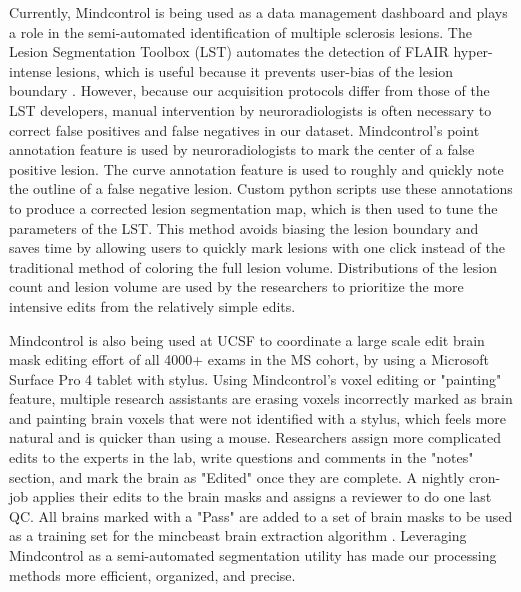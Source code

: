 Currently, Mindcontrol is being used as a data management dashboard and plays a role in the semi-automated identification of multiple sclerosis lesions. The Lesion Segmentation Toolbox (LST) automates the detection of FLAIR hyper-intense lesions, which is useful because it prevents user-bias of the lesion boundary \cite{Schmidt_2012}. However, because our acquisition protocols differ from those of the LST developers, manual intervention by neuroradiologists is often necessary to correct false positives and false negatives in our dataset. Mindcontrol's point annotation feature is used by neuroradiologists to mark the center of a false positive lesion. The curve annotation feature is used to roughly and quickly note the outline of a false negative lesion. Custom python scripts use these annotations to produce a corrected lesion segmentation map, which is then used to tune the parameters of the LST. This method avoids biasing the lesion boundary and saves time by allowing users to quickly mark lesions with one click instead of the traditional method of coloring the full lesion volume. Distributions of the lesion count and lesion volume are used by the researchers to prioritize the more intensive edits from the relatively simple edits.

Mindcontrol is also being used at UCSF to coordinate a large scale edit brain mask editing effort of all 4000+ exams in the MS cohort, by using a Microsoft Surface Pro 4 tablet with stylus. Using Mindcontrol's voxel editing or "painting" feature, multiple research assistants are erasing voxels incorrectly marked as brain and painting brain voxels that were not identified with a stylus, which feels more natural and is quicker than using a mouse. Researchers assign more complicated edits to the experts in the lab, write questions and comments in the "notes" section, and mark the brain as "Edited" once they are complete. A nightly cron-job applies their edits to the brain masks and assigns a reviewer to do one last QC. All brains marked with a "Pass" are added to a set of brain masks to be  used as a training set for the mincbeast brain extraction algorithm \cite{eskildsen2012beast}. Leveraging Mindcontrol as a semi-automated segmentation utility has made our processing methods more efficient, organized, and precise.






